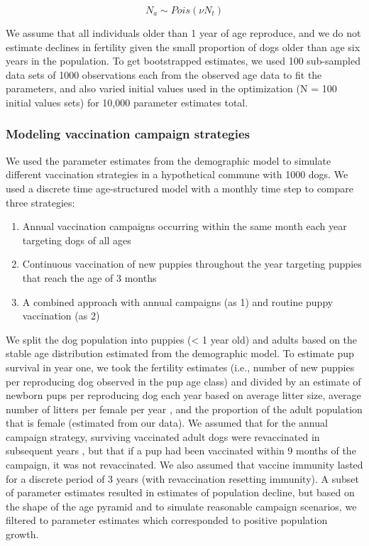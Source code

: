 \documentclass[tropicalmed,article,submit,moreauthors,pdftex]{mdpi}
\providecommand{\tightlist}{%
  \setlength{\itemsep}{0pt}\setlength{\parskip}{4pt}}
\begin{document}
\[ N_{a} \sim Pois(\nu N_t) \]

We assume that all individuals older than 1 year of age reproduce, and
we do not estimate declines in fertility given the small proportion of
dogs older than age six years in the population. To get bootstrapped
estimates, we used 100 sub-sampled data sets of 1000 observations each
from the observed age data to fit the parameters, and also varied
initial values used in the optimization (N = 100 initial values sets)
for 10,000 parameter estimates total.

\hypertarget{modeling-vaccination-campaign-strategies}{%
\subsubsection{Modeling vaccination campaign
strategies}\label{modeling-vaccination-campaign-strategies}}

We used the parameter estimates from the demographic model to simulate
different vaccination strategies in a hypothetical commune with 1000
dogs. We used a discrete time age-structured model with a monthly time
step to compare three strategies:

\begin{enumerate}
\def\labelenumi{\arabic{enumi})}
\tightlist
\item
  Annual vaccination campaigns occurring within the same month each year
  targeting dogs of all ages
\item
  Continuous vaccination of new puppies throughout the year targeting
  puppies that reach the age of 3 months
\item
  A combined approach with annual campaigns (as 1) and routine puppy
  vaccination (as 2)
\end{enumerate}

We split the dog population into puppies (\textless{} 1 year old) and
adults based on the stable age distribution estimated from the
demographic model. To estimate pup survival in year one, we took the
fertility estimates (i.e., number of new puppies per reproducing dog
observed in the pup age class) and divided by an estimate of newborn
pups per reproducing dog each year based on average litter size, average
number of litters per female per year
\citep{hampson2009, morters2014, czupryna2016}, and the proportion of
the adult population that is female (estimated from our data). We
assumed that for the annual campaign strategy, surviving vaccinated
adult dogs were revaccinated in subsequent years
\citep{delriovilas2017}, but that if a pup had been vaccinated within 9
months of the campaign, it was not revaccinated. We also assumed that
vaccine immunity lasted for a discrete period of 3 years (with
revaccination resetting immunity). A subset of parameter estimates
resulted in estimates of population decline, but based on the shape of
the age pyramid and to simulate reasonable campaign scenarios, we
filtered to parameter estimates which corresponded to positive
population growth.
\end{document}
